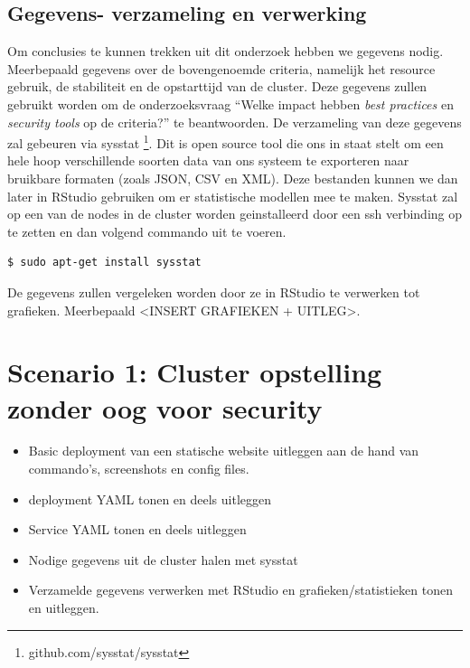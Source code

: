 \subsection{Gegevens- verzameling en verwerking}
Om conclusies te kunnen trekken uit dit onderzoek hebben we gegevens nodig. Meerbepaald gegevens over de bovengenoemde criteria, namelijk het resource gebruik, de stabiliteit en de opstarttijd van de cluster. Deze gegevens zullen gebruikt worden om de onderzoeksvraag ``Welke impact hebben \textit{best practices} en \textit{security tools} op de criteria?'' te beantwoorden. De verzameling van deze gegevens zal gebeuren via sysstat \footnote{github.com/sysstat/sysstat}. Dit is open source tool die ons in staat stelt om een hele hoop verschillende soorten data van ons systeem te exporteren naar bruikbare formaten (zoals JSON, CSV en XML). Deze bestanden kunnen we dan later in RStudio gebruiken om er statistische modellen mee te maken. Sysstat zal op een van de nodes in de cluster worden geinstalleerd door een ssh verbinding op te zetten en dan volgend commando uit te voeren.
\begin{verbatim} 
$ sudo apt-get install sysstat
\end{verbatim}


De gegevens zullen vergeleken worden door ze in RStudio te verwerken tot grafieken. Meerbepaald <INSERT GRAFIEKEN + UITLEG>.

\clearpage
\section{Scenario 1: Cluster opstelling zonder oog voor security}
\begin{itemize}
	\item Basic deployment van een statische website uitleggen aan de hand van commando's, screenshots en config files. 
	\item deployment YAML tonen en deels uitleggen
	\item Service YAML tonen en deels uitleggen
	\item Nodige gegevens uit de cluster halen met sysstat
	\item Verzamelde gegevens verwerken met RStudio en grafieken/statistieken tonen en uitleggen.
\end{itemize}


